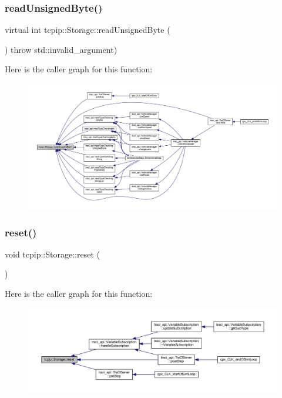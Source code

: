 \subsubsection{\texorpdfstring{read\+Unsigned\+Byte()}{readUnsignedByte()}}
{\footnotesize\ttfamily virtual int tcpip\+::\+Storage\+::read\+Unsigned\+Byte (\begin{DoxyParamCaption}{ }\end{DoxyParamCaption}) throw  std\+::invalid\+\_\+argument) \hspace{0.3cm}{\ttfamily [virtual]}}

Here is the caller graph for this function\+:\nopagebreak
\begin{figure}[H]
\begin{center}
\leavevmode
\includegraphics[width=350pt]{classtcpip_1_1_storage_a46215cfa07dcabbdea932e4c69504019_icgraph}
\end{center}
\end{figure}
\mbox{\label{classtcpip_1_1_storage_a5f4f62ada96d7e48465eb27047c4595a}} 
\subsubsection{\texorpdfstring{reset()}{reset()}}
{\footnotesize\ttfamily void tcpip\+::\+Storage\+::reset (\begin{DoxyParamCaption}{ }\end{DoxyParamCaption})}

Here is the caller graph for this function\+:\nopagebreak
\begin{figure}[H]
\begin{center}
\leavevmode
\includegraphics[width=350pt]{classtcpip_1_1_storage_a5f4f62ada96d7e48465eb27047c4595a_icgraph}
\end{center}
\end{figure}
\mbox{\label{classtcpip_1_1_storage_a69f9705be09f7e5be1a29f4d145f451a}} 
